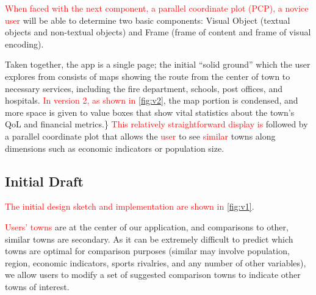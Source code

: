 \documentclass[letterpaper,inpress]{jdsart}
\begin{document}
{\textcolor{red}{When faced with the next component, a parallel coordinate plot (PCP), a novice user}} will be able to determine two basic components: Visual Object (textual objects and non-textual objects) and Frame (frame of content and frame of visual encoding).

Taken together, the app is a single page; the initial ``solid ground'' which the user explores from consists of maps showing the route from the center of town to necessary services, including the fire department, schools, post offices, and hospitals. {\textcolor{red}{In version 2, as shown in}} \autoref{fig:v2}, the map portion is condensed, and more space is given to value boxes that show vital statistics about the town's QoL and financial metrics.\} {\textcolor{red}{This relatively straightforward display is}} followed by a parallel coordinate plot that allows the {\textcolor{red}{user}} to see {\textcolor{red}{similar}} towns along dimensions such as economic indicators or population size.

\hypertarget{initial-draft}{%
\subsection{Initial Draft}\label{initial-draft}}

{\textcolor{red}{The initial design sketch and implementation are shown in}} \autoref{fig:v1}.

{\textcolor{red}{Users' towns}} are at the center of our application, and comparisons to other, similar towns are secondary. As it can be extremely difficult to predict which towns are optimal for comparison purposes (similar may involve population, region, economic indicators, sports rivalries, and any number of other variables), we allow users to modify a set of suggested comparison towns to indicate other towns of interest.
\end{document}
